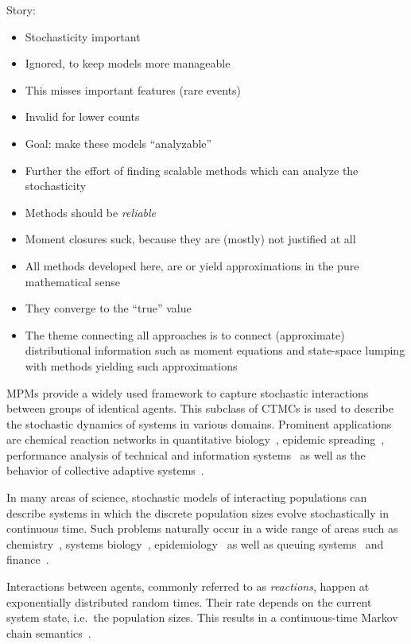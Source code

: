 Story:
\begin{itemize}
    \item Stochasticity important
    \item Ignored, to keep models more manageable
    \item This misses important features (rare events)
    \item Invalid for lower counts
    \item Goal: make these models ``analyzable''
    \item Further the effort of finding scalable methods which can analyze the stochasticity
    \item Methods should be \emph{reliable}
    \item Moment closures suck, because they are (mostly) not justified at all
    \item All methods developed here, are or yield approximations in the pure mathematical sense
    \item They converge to the ``true'' value
    \item The theme connecting all approaches is to connect (approximate) distributional information such as moment equations and state-space lumping with methods yielding such approximations
\end{itemize}

\Acfp{MPM} provide a
widely used framework to capture stochastic interactions between groups of identical agents.
This subclass of \acfp{CTMC}  is used
to describe the stochastic dynamics of systems in various domains.
Prominent applications are chemical reaction networks in quantitative
biology~\parencite{BuchWolkenhauer},
epidemic spreading~\parencite{porter2016dynamical}, performance analysis  of technical and
information systems~\parencite{bortolussi2013continuous,gast2019} as well as the behavior of
collective adaptive systems~\parencite{bernardo2016}.


In many areas of science, stochastic models  of interacting populations can describe systems in which the discrete population sizes evolve stochastically in continuous time.
Such problems naturally occur in a wide range of areas such as chemistry~\parencite{gillespie1977exact}, systems biology~\parencite{wilkinson2018stochastic,BuchWolkenhauer}, epidemiology~\parencite{mode2000stochastic} as well as    queuing systems~\parencite{breuer2003markov} and finance~\parencite{pardoux2008markov}.

Interactions between agents, commonly referred to as \emph{reactions}, happen at exponentially distributed random times. 
Their rate depends on the current system state, i.e.\ the population sizes.
This results in a continuous-time Markov chain semantics~\parencite{anderson2012continuous}.

